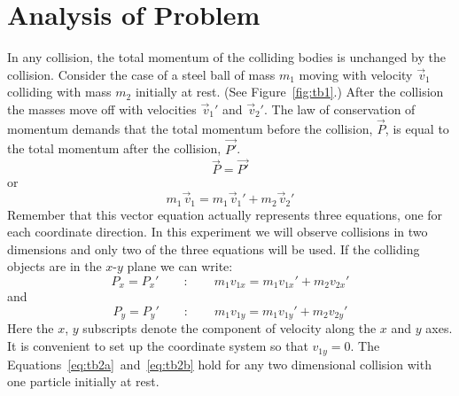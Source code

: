 \section*{Analysis of Problem}
     In any collision, the total momentum of the colliding bodies is
unchanged by the collision.  Consider the case of a steel ball of mass
$m_{1}$ moving with velocity $\vec{\,v}_{1}$ colliding with mass $m_{2}$ initially at
rest.  (See Figure~\ref{fig:tb1}.)
After the collision the masses move off with velocities $\vec{\,v}_{1}'$ and $\vec{\,v}_{2}'$.
The law of conservation of momentum demands that the total momentum
before the collision, $\vec{P}$, is equal to the total momentum after the
collision, $\vec{P'}$.
\[
\vec{P} = \vec{P'}
\]
or
\begin{equation}
m_{1} \vec{\,v}_{1}  = m_1 \vec{\,v}_{1}' + m_2 \vec{\,v}_{2}'  \label{eq:tb1}
\end{equation}
     Remember that this vector equation actually represents
three equations, one for each coordinate direction.  In this experiment
we will observe collisions in two dimensions and only two of the three
equations will be used.  If the colliding objects are in the $x$-$y$ plane
we can write:
\begin{equation}
P_{x} = P_{x}' \qquad : \qquad m_1 v_{1x} = m_1 v_{1x}' + m_2 v_{2x}'
    \label{eq:tb2a}
\end{equation}
and
\begin{equation}
P_{y} = P_{y}' \qquad : \qquad m_1 v_{1y} = m_1 v_{1y}' + m_2 v_{2y}'
    \label{eq:tb2b}
\end{equation}
Here the $x$, $y$ subscripts denote the component of velocity along the $x$
 and $y$
axes.  It is convenient to set up the coordinate system so that $v_{1y} = 0$.
The Equations~\ref{eq:tb2a}~and~\ref{eq:tb2b} hold for any two dimensional
collision with one particle initially at rest.

